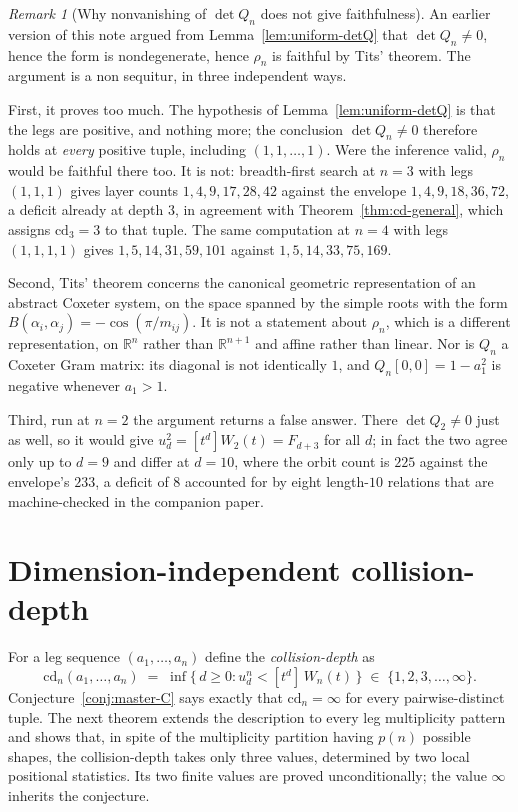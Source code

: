 \documentclass[11pt,a4paper]{article}
\theoremstyle{remark}
\newtheorem{remark}[theorem]{Remark}
\theoremstyle{plain}
\begin{document}
\begin{remark}[Why nonvanishing of $\det Q_n$ does not give faithfulness]
\label{rem:detQ-nonsequitur}
An earlier version of this note argued from Lemma~\ref{lem:uniform-detQ} that
$\det Q_n \ne 0$, hence the form is nondegenerate, hence $\rho_n$ is faithful by
Tits' theorem. The argument is a non sequitur, in three independent ways.

First, it proves too much. The hypothesis of Lemma~\ref{lem:uniform-detQ} is
that the legs are positive, and nothing more; the conclusion $\det Q_n \neq 0$
therefore holds at \emph{every} positive tuple, including $(1,1,\ldots,1)$. Were
the inference valid, $\rho_n$ would be faithful there too. It is not:
breadth-first search at $n=3$ with legs $(1,1,1)$ gives layer counts
$1, 4, 9, 17, 28, 42$ against the envelope $1, 4, 9, 18, 36, 72$, a deficit
already at depth $3$, in agreement with Theorem~\ref{thm:cd-general}, which
assigns $\mathrm{cd}_3 = 3$ to that tuple. The same computation at $n=4$ with
legs $(1,1,1,1)$ gives $1, 5, 14, 31, 59, 101$ against $1, 5, 14, 33, 75, 169$.

Second, Tits' theorem concerns the canonical geometric representation of an
abstract Coxeter system, on the space spanned by the simple roots with the form
$B(\alpha_i,\alpha_j) = -\cos(\pi/m_{ij})$. It is not a statement about $\rho_n$,
which is a different representation, on $\mathbb{R}^n$ rather than
$\mathbb{R}^{n+1}$ and affine rather than linear. Nor is $Q_n$ a Coxeter Gram
matrix: its diagonal is not identically $1$, and $Q_n[0,0] = 1 - a_1^2$ is
negative whenever $a_1 > 1$.

Third, run at $n=2$ the argument returns a false answer. There $\det Q_2 \neq 0$
just as well, so it would give $u_d^2 = [t^d]W_2(t) = F_{d+3}$ for all $d$;
in fact the two agree only up to $d = 9$ and differ at $d = 10$, where the orbit
count is $225$ against the envelope's $233$, a deficit of $8$ accounted for by
eight length-$10$ relations that are machine-checked in the companion paper.
\end{remark}

\section{Dimension-independent collision-depth}\label{sec:cd}

For a leg sequence $(a_1, \ldots, a_n)$ define the
\emph{collision-depth} as
\[
\mathrm{cd}_n(a_1, \ldots, a_n)
\;=\; \inf\bigl\{\, d \ge 0 : u_d^n < [t^d]\, W_n(t) \,\bigr\}
\;\in\; \{1, 2, 3, \ldots, \infty\}.
\]
Conjecture~\ref{conj:master-C} says exactly that $\mathrm{cd}_n = \infty$ for
every pairwise-distinct tuple. The next theorem extends the description to every
leg multiplicity pattern and shows that, in spite of the multiplicity partition
having $p(n)$ possible shapes, the collision-depth takes only three values,
determined by two local positional statistics. Its two finite values are proved
unconditionally; the value $\infty$ inherits the conjecture.
\end{document}
